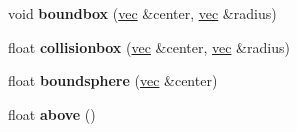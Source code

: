 \begin{DoxyCompactItemize}
void {\bfseries boundbox} (\hyperlink{structvec}{vec} \&center, \hyperlink{structvec}{vec} \&radius)
\item 
\mbox{\label{structmodel_a2f7ce1c820b3eb97e8fe9c07972c5332}} 
float {\bfseries collisionbox} (\hyperlink{structvec}{vec} \&center, \hyperlink{structvec}{vec} \&radius)
\item 
\mbox{\label{structmodel_af60e0134a1153a6bc412434598203370}} 
float {\bfseries boundsphere} (\hyperlink{structvec}{vec} \&center)
\item 
\mbox{\label{structmodel_ae5e5123ea6a1c97e6c0354a66dc92eb7}} 
float {\bfseries above} ()
\end{DoxyCompactItemize}
